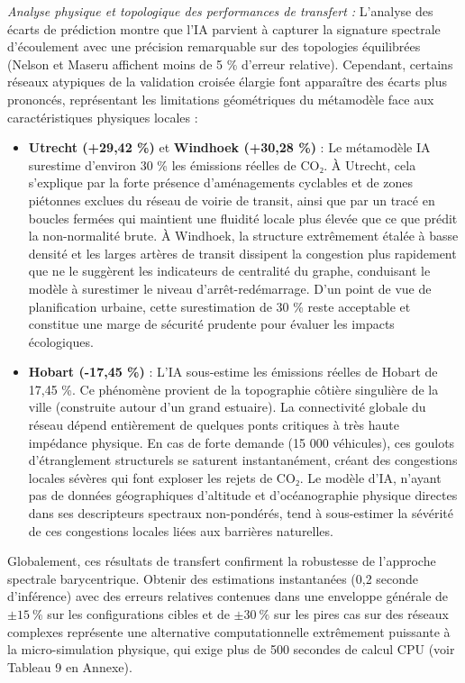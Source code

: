 \documentclass[10pt, a4paper]{article}
\providecommand{\tightlist}{}
\begin{document}
\emph{Analyse physique et topologique des performances de transfert :}
L'analyse des écarts de prédiction montre que l'IA parvient à capturer
la signature spectrale d'écoulement avec une précision remarquable sur
des topologies équilibrées (Nelson et Maseru affichent moins de 5 \%
d'erreur relative). Cependant, certains réseaux atypiques de la
validation croisée élargie font apparaître des écarts plus prononcés,
représentant les limitations géométriques du métamodèle face aux
caractéristiques physiques locales :

\begin{itemize}
\tightlist
\item
  \textbf{Utrecht (+29,42 \%)} et \textbf{Windhoek (+30,28 \%)} : Le
  métamodèle IA surestime d'environ 30 \% les émissions réelles de CO₂.
  À Utrecht, cela s'explique par la forte présence d'aménagements
  cyclables et de zones piétonnes exclues du réseau de voirie de
  transit, ainsi que par un tracé en boucles fermées qui maintient une
  fluidité locale plus élevée que ce que prédit la non-normalité brute.
  À Windhoek, la structure extrêmement étalée à basse densité et les
  larges artères de transit dissipent la congestion plus rapidement que
  ne le suggèrent les indicateurs de centralité du graphe, conduisant le
  modèle à surestimer le niveau d'arrêt-redémarrage. D'un point de vue
  de planification urbaine, cette surestimation de 30 \% reste
  acceptable et constitue une marge de sécurité prudente pour évaluer
  les impacts écologiques.
\item
  \textbf{Hobart (-17,45 \%)} : L'IA sous-estime les émissions réelles
  de Hobart de 17,45 \%. Ce phénomène provient de la topographie côtière
  singulière de la ville (construite autour d'un grand estuaire). La
  connectivité globale du réseau dépend entièrement de quelques ponts
  critiques à très haute impédance physique. En cas de forte demande (15
  000 véhicules), ces goulots d'étranglement structurels se saturent
  instantanément, créant des congestions locales sévères qui font
  exploser les rejets de CO₂. Le modèle d'IA, n'ayant pas de données
  géographiques d'altitude et d'océanographie physique directes dans ses
  descripteurs spectraux non-pondérés, tend à sous-estimer la sévérité
  de ces congestions locales liées aux barrières naturelles.
\end{itemize}

Globalement, ces résultats de transfert confirment la robustesse de
l'approche spectrale barycentrique. Obtenir des estimations instantanées
(0,2 seconde d'inférence) avec des erreurs relatives contenues dans une
enveloppe générale de \(\pm 15\ \%\) sur les configurations cibles et de
\(\pm 30\ \%\) sur les pires cas sur des réseaux complexes représente
une alternative computationnelle extrêmement puissante à la
micro-simulation physique, qui exige plus de 500 secondes de calcul CPU
(voir Tableau 9 en Annexe).
\end{document}
